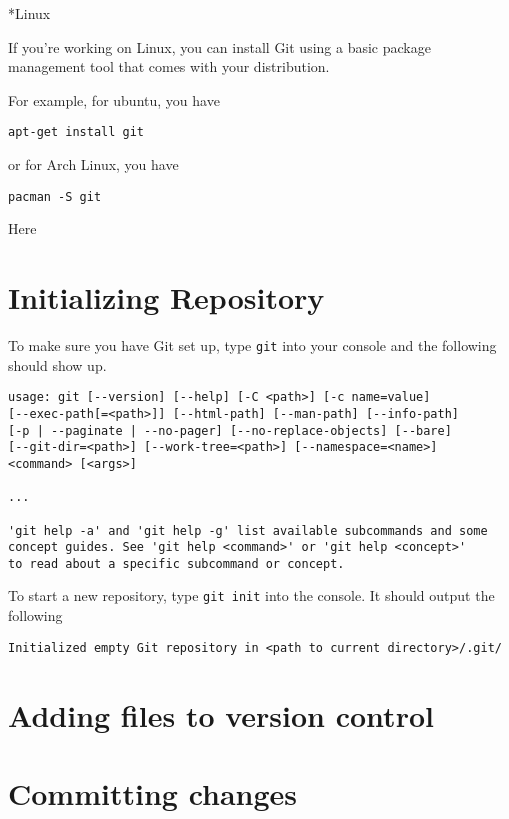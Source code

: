 \documentclass{amsart}
\makeatletter
\renewcommand\subsection{\@startsection{subsection}{2}%
  \z@{-.5\linespacing\@plus-.7\linespacing}{.5\linespacing}%
  {\normalfont\scshape}}
\makeatother
\begin{document}
\subsection*{Linux}

If you're working on Linux, you can install Git using a basic package management tool that comes with your distribution.

For example, for ubuntu, you have

\verb|apt-get install git|

or for Arch Linux, you have

\verb|pacman -S git|

Here 
\newpage

\section*{Initializing Repository}

To make sure you have Git set up, type \verb|git| into your console and the following should show up.

\begin{verbatim}
usage: git [--version] [--help] [-C <path>] [-c name=value]
[--exec-path[=<path>]] [--html-path] [--man-path] [--info-path]
[-p | --paginate | --no-pager] [--no-replace-objects] [--bare]
[--git-dir=<path>] [--work-tree=<path>] [--namespace=<name>]
<command> [<args>]

...

'git help -a' and 'git help -g' list available subcommands and some
concept guides. See 'git help <command>' or 'git help <concept>'
to read about a specific subcommand or concept.
\end{verbatim}

To start a new repository, type \verb|git init| into the console. It should output the following

\begin{verbatim}
Initialized empty Git repository in <path to current directory>/.git/
\end{verbatim}


\newpage

\section*{Adding files to version control}

\newpage

\section*{Committing changes}
\end{document}
